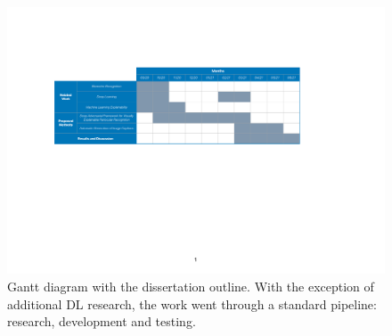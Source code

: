 \begin{figure}[h]
\centering
\includegraphics[width=405pt]{figures/figure_1.pdf}
\caption{Gantt diagram with the dissertation outline. With the exception of additional \ac{DL} research, the work went through a standard pipeline: research, development and testing.}
\label{fig:gantt_diagram}
\end{figure}